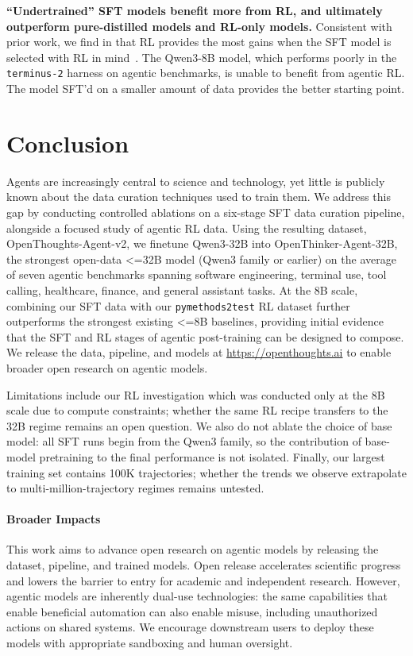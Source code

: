 \documentclass{llmxive}
\begin{document}


\textbf{``Undertrained'' SFT models benefit more from RL, and ultimately outperform pure-distilled models and RL-only models.} Consistent with prior work, we find in  that RL provides the most gains when the SFT model is selected with RL in mind~\citep{kang2025quagmiressftrlposttraininghigh}. The Qwen3-8B model, which performs poorly in the \texttt{terminus-2} harness on agentic benchmarks, is unable to benefit from agentic RL. The model SFT'd on a smaller amount of data provides the better starting point.

\section{Conclusion}
\label{sec:conclusion}

Agents are increasingly central to science and technology, yet little is publicly known about the data curation techniques used to train them.
We address this gap by conducting controlled ablations on a six-stage SFT data curation pipeline, alongside a focused study of agentic RL data. Using the resulting dataset, OpenThoughts-Agent-v2, we finetune Qwen3-32B into OpenThinker-Agent-32B, the strongest open-data <=32B model (Qwen3 family or earlier) on the average of seven agentic benchmarks spanning software engineering, terminal use, tool calling, healthcare, finance, and general assistant tasks. At the 8B scale, combining our SFT data with our \texttt{pymethods2test} RL dataset further outperforms the strongest existing <=8B baselines, providing initial evidence that the SFT and RL stages of agentic post-training can be designed to compose. 
We release the data, pipeline, and models at \url{https://openthoughts.ai} to enable broader open research on agentic models.

Limitations include our RL investigation which was conducted only at the 8B scale due to compute constraints; whether the same RL recipe transfers to the 32B regime remains an open question.  We also do not ablate the choice of base model: all SFT runs begin from the Qwen3 family, so the contribution of base-model pretraining to the final performance is not isolated. Finally, our largest training set contains 100K trajectories; whether the trends we observe extrapolate to multi-million-trajectory regimes remains untested.

\paragraph{Broader Impacts}
This work aims to advance open research on agentic models by releasing the dataset, pipeline, and trained models. Open release accelerates scientific progress and lowers the barrier to entry for academic and independent research. However, agentic models are inherently dual-use technologies: the same capabilities that enable beneficial automation can also enable misuse, including unauthorized actions on shared systems. We encourage downstream users to deploy these models with appropriate sandboxing and human oversight.
\end{document}
